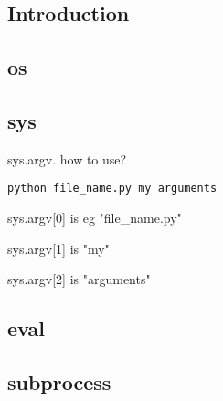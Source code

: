 
\subsection{Introduction}


\subsection{os}

\subsection{sys}
sys.argv. how to use?


\begin{verbatim}
python file_name.py my arguments
\end{verbatim}

sys.argv[0] is eg "file\_name.py"

sys.argv[1] is "my"

sys.argv[2] is "arguments"

\subsection{eval}

\subsection{subprocess}



